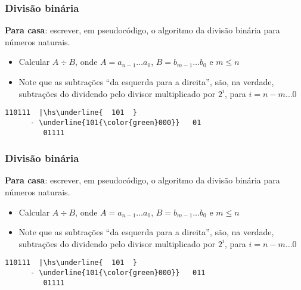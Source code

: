 \documentclass{beamer}
\begin{document}

\begin{frame}[fragile]
\frametitle{Divisão binária}

\textbf{Para casa}: escrever, em pseudocódigo, o algoritmo da divisão binária para números naturais.

\begin{itemize}
\item Calcular $A \div B$, onde $A = a_{n-1} \ldots a_0$, $B = b_{m-1} \ldots b_0$ e $m \le n$
\item Note que as subtrações ``da esquerda para a direita'', são, na verdade, subtrações do dividendo pelo divisor multiplicado por $2^i$, para $i = n-m \ldots 0$
\end{itemize}

\def\hs{\hspace{-1mm}}

\begin{Verbatim}[commandchars=\\\{\},codes={\catcode`$=3\catcode`^=7}]
        110111  |\hs\underline{  101  }
      - \underline{101{\color{green}000}}   01
         01111 
\end{Verbatim}

\vspace{44pt}

\end{frame}


\begin{frame}[fragile]
\frametitle{Divisão binária}

\textbf{Para casa}: escrever, em pseudocódigo, o algoritmo da divisão binária para números naturais.

\begin{itemize}
\item Calcular $A \div B$, onde $A = a_{n-1} \ldots a_0$, $B = b_{m-1} \ldots b_0$ e $m \le n$
\item Note que as subtrações ``da esquerda para a direita'', são, na verdade, subtrações do dividendo pelo divisor multiplicado por $2^i$, para $i = n-m \ldots 0$
\end{itemize}

\def\hs{\hspace{-1mm}}

\begin{Verbatim}[commandchars=\\\{\},codes={\catcode`$=3\catcode`^=7}]
        110111  |\hs\underline{  101  }
      - \underline{101{\color{green}000}}   011
         01111 
\end{Verbatim}

\vspace{44pt}

\end{frame}
\end{document}
